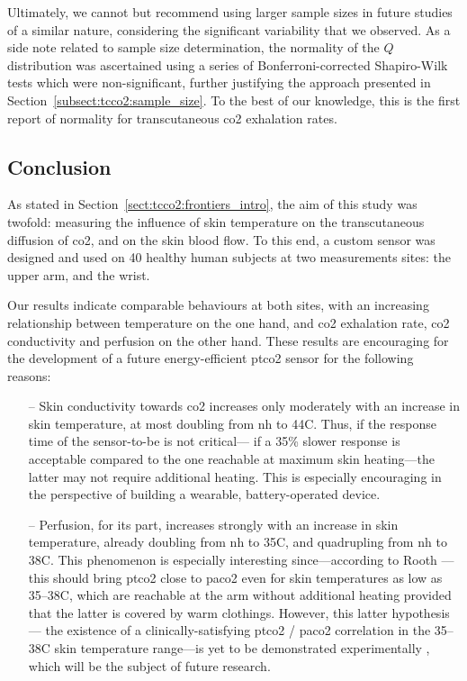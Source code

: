 Ultimately, we cannot but recommend using larger sample sizes in future studies of a similar nature, considering the significant variability that we observed. As a side note related to sample size determination, the normality of the $Q$ distribution was ascertained using a series of Bonferroni-corrected Shapiro-Wilk tests which were non-significant, further justifying the approach presented in Section~\ref{subsect:tcco2:sample_size}. To the best of our knowledge, this is the first report of normality for transcutaneous \gls{co2} exhalation rates.

\subsection{Conclusion}\label{sect:conclusion}

As stated in Section~\ref{sect:tcco2:frontiers_intro}, the aim of this study was twofold: measuring the influence of skin temperature on the transcutaneous diffusion of \gls{co2}, and on the skin blood flow. To this end, a custom sensor was designed and used on 40 healthy human subjects at two measurements sites: the upper arm, and the wrist.

Our results indicate comparable behaviours at both sites, with an increasing relationship between temperature on the one hand, and \gls{co2} exhalation rate, \gls{co2} conductivity and perfusion on the other hand. These results are encouraging for the development of a future energy-efficient \gls{ptco2} sensor for the following reasons:

\begin{itemize}
	\item[--] Skin conductivity towards \gls{co2} increases only moderately with an increase in skin temperature, at most doubling from \gls{nh} to 44{\degree}C. Thus, if the response time of the sensor-to-be is not critical---\ie{} if a 35\% slower response is acceptable compared to the one reachable at maximum skin heating---the latter may not require additional heating. This is especially encouraging in the perspective of building a wearable, battery-operated device.
	\item[--] Perfusion, for its part, increases strongly with an increase in skin temperature, already doubling from \gls{nh} to 35{\degree}C, and quadrupling from \gls{nh} to 38{\degree}C. This phenomenon is especially interesting since---according to Rooth \etal{}\cite{rooth1987}---this should bring \gls{ptco2} close to \gls{paco2} even for skin temperatures as low as 35--38{\degree}C, which are reachable at the arm without additional heating provided that the latter is covered by warm clothings. \mfrin{}However, this latter hypothesis---\ie{} the existence of a clinically-satisfying \gls{ptco2} / \gls{paco2} correlation in the 35--38{\degree}C skin temperature range---is yet to be demonstrated experimentally \invivo{}, which will be the subject of future research.
\end{itemize}

